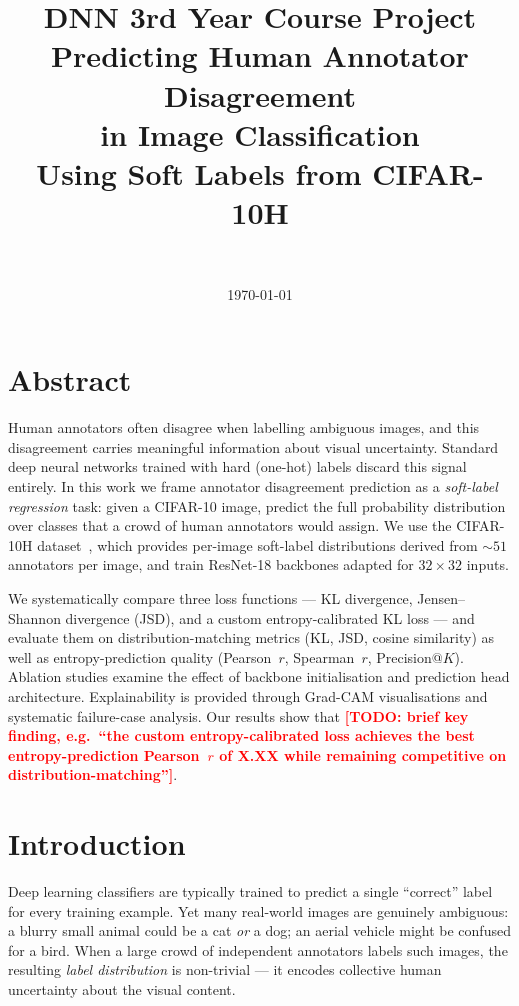 \documentclass[11pt,a4paper]{article}
\title{%
  \vspace{-1cm}
  {\large DNN 3rd Year Course Project}\\[0.4em]
  {\LARGE\bfseries Predicting Human Annotator Disagreement\\
  in Image Classification}\\[0.4em]
  {\normalsize Using Soft Labels from CIFAR-10H}
}
\author{%
  \todo{Team Name}\\
  \small\textit{\todo{University / Department}}
}
\date{\today}
\newcommand{\todo}[1]{\textcolor{red}{\textbf{[TODO: #1]}}}
\begin{document}
\maketitle
\tableofcontents
\newpage

\section*{Abstract}

Human annotators often disagree when labelling ambiguous images, and this
disagreement carries meaningful information about visual uncertainty.
Standard deep neural networks trained with hard (one-hot) labels discard
this signal entirely.
In this work we frame annotator disagreement prediction as a
\emph{soft-label regression} task: given a CIFAR-10 image, predict the full
probability distribution over classes that a crowd of human annotators would
assign.
We use the CIFAR-10H dataset~\cite{peterson2019human}, which provides
per-image soft-label distributions derived from ${\sim}51$ annotators per
image, and train ResNet-18 backbones adapted for $32{\times}32$ inputs.

We systematically compare three loss functions — KL divergence, Jensen–Shannon
divergence (JSD), and a custom entropy-calibrated KL loss — and evaluate them
on distribution-matching metrics (KL, JSD, cosine similarity) as well as
entropy-prediction quality (Pearson~$r$, Spearman~$r$, Precision@$K$).
Ablation studies examine the effect of backbone initialisation and prediction
head architecture.
Explainability is provided through Grad-CAM visualisations and systematic
failure-case analysis.
Our results show that \todo{brief key finding, e.g.\ ``the custom
entropy-calibrated loss achieves the best entropy-prediction Pearson~$r$ of
\textbf{X.XX} while remaining competitive on distribution-matching''}.

\newpage

\section{Introduction}

Deep learning classifiers are typically trained to predict a single ``correct''
label for every training example.
Yet many real-world images are genuinely ambiguous: a blurry small animal
could be a cat \emph{or} a dog; an aerial vehicle might be confused for a
bird.
When a large crowd of independent annotators labels such images, the resulting
\emph{label distribution} is non-trivial — it encodes collective human
uncertainty about the visual content.
\end{document}
